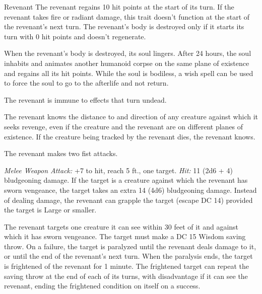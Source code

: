 \documentclass[10pt,a4paper,twoside,twocolumn,openany,nodeprecatedcode]{dndbook}
\begin{document}
\begin{DndMonster}[float=ht]{Revenant}
\DndMonsterBasics[
armor-class = {13 (leather armor)},
hit-points = {\DndDice{16d8 + 64}},
speed = {30 ft.}
]
\DndMonsterAbilityScores[
 str = 18,
 dex = 14,
 con = 18,
 int = 13,
 wis = 16,
 cha = 18
]
\DndMonsterDetails[
saving-throws = {Str +7, Con +7, Wis +6, Cha +7},
damage-resistances = {necrotic, psychic},
damage-immunities = {poison},
senses = {darkvision 60 ft., passive perception 13},
languages = {the languages it knew in life},
challenge = 5,
]
The revenant regains 10 hit points at the start of its turn. If the revenant takes fire or radiant damage, this trait doesn't function at the start of the revenant's next turn. The revenant's body is destroyed only if it starts its turn with 0 hit points and doesn't regenerate.

When the revenant's body is destroyed, its soul lingers. After 24 hours, the soul inhabits and animates another humanoid corpse on the same plane of existence and regains all its hit points. While the soul is bodiless, a wish spell can be used to force the soul to go to the afterlife and not return.

The revenant is immune to effects that turn undead.

The revenant knows the distance to and direction of any creature against which it seeks revenge, even if the creature and the revenant are on different planes of existence. If the creature being tracked by the revenant dies, the revenant knows.

\par
{}
The revenant makes two fist attacks.

\textsl{Melee Weapon Attack:} +7 to hit, reach 5 ft., one target. \textsl{Hit:} 11 (2d6 + 4) bludgeoning damage. If the target is a creature against which the revenant has sworn vengeance, the target takes an extra 14 (4d6) bludgeoning damage. Instead of dealing damage, the revenant can grapple the target (escape DC 14) provided the target is Large or smaller.

The revenant targets one creature it can see within 30 feet of it and against which it has sworn vengeance. The target must make a DC 15 Wisdom saving throw. On a failure, the target is paralyzed until the revenant deals damage to it, or until the end of the revenant's next turn. When the paralysis ends, the target is frightened of the revenant for 1 minute. The frightened target can repeat the saving throw at the end of each of its turns, with disadvantage if it can see the revenant, ending the frightened condition on itself on a success.

\end{DndMonster}
\end{document}
